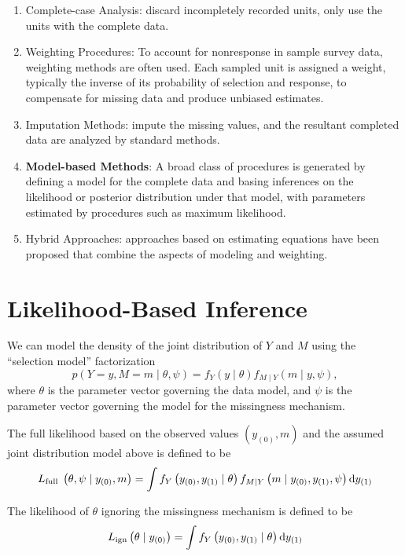 \begin{enumerate}
	\item Complete-case Analysis: discard incompletely recorded units, only use the units with the complete data.
	\item Weighting Procedures: To account for nonresponse in sample survey data, weighting methods are often used. Each sampled unit is assigned a weight, typically the inverse of its probability of selection and response, to compensate for missing data and produce unbiased estimates.
	\item Imputation Methods: impute the missing values, and the resultant completed data are analyzed by standard methods.
	\item \textbf{Model-based Methods}: A broad class of procedures is generated by defining a model for the complete data and basing inferences on the likelihood or posterior distribution under that model, with parameters estimated by procedures such as maximum likelihood.
	\item Hybrid Approaches: approaches based on estimating equations have been
	      proposed that combine the aspects of modeling and weighting.
\end{enumerate}

\section{Likelihood-Based Inference}

We can model the density of the joint distribution of \(Y\) and \(M\) using the ``selection model'' factorization
\begin{equation*}
	p(Y=y,M=m\mid\theta,\psi)=f_{Y}(y\mid\theta)f_{M\mid Y}(m\mid y,\psi),
\end{equation*}
where \(\theta\) is the parameter vector governing the data model, and \(\psi\) is the parameter vector governing the model for the missingness mechanism.

The full likelihood based on the observed values \(\left(y_{(0)}, m\right)\) and the assumed joint distribution model above is defined to be
\begin{equation}
	L_{\text {full }}\left(\theta, \psi \mid y_{(0)}, m\right)=\int f_{Y}\left(y_{(0)}, y_{(1)} \mid \theta\right) f_{M \mid Y}\left(m \mid y_{(0)}, y_{(1)}, \psi\right) \mathop{}\!\mathrm{d} y_{(1)}
\end{equation}

The likelihood of \(\theta\) ignoring the missingness mechanism is defined to be
\begin{equation}
	L_{\mathrm{ign}}\left(\theta \mid y_{(0)}\right)=\int f_{Y}\left(y_{(0)}, y_{(1)} \mid \theta\right) \mathop{}\!\mathrm{d} y_{(1)}
\end{equation}

